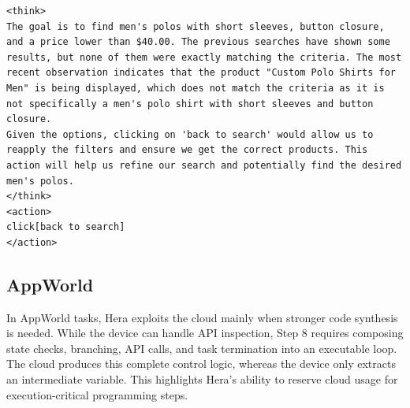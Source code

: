 \documentclass{article}
\newcommand{\name}{Hera\xspace}
\begin{document}
\begin{devicebox}[title=Step 11: device agent output (if routed)]
\begin{lstlisting}[style=mytt]
<think>
The goal is to find men's polos with short sleeves, button closure, and a price lower than $40.00. The previous searches have shown some results, but none of them were exactly matching the criteria. The most recent observation indicates that the product "Custom Polo Shirts for Men" is being displayed, which does not match the criteria as it is not specifically a men's polo shirt with short sleeves and button closure.
Given the options, clicking on 'back to search' would allow us to reapply the filters and ensure we get the correct products. This action will help us refine our search and potentially find the desired men's polos.
</think>
<action>
click[back to search]
</action>
\end{lstlisting}
\end{devicebox}



\subsection{AppWorld}

In AppWorld tasks, \name exploits the cloud mainly when stronger code synthesis is needed. While the device can handle API inspection, Step 8 requires composing state checks, branching, API calls, and task termination into an executable loop. The cloud produces this complete control logic, whereas the device only extracts an intermediate variable. This highlights \name’s ability to reserve cloud usage for execution-critical programming steps.
\end{document}
